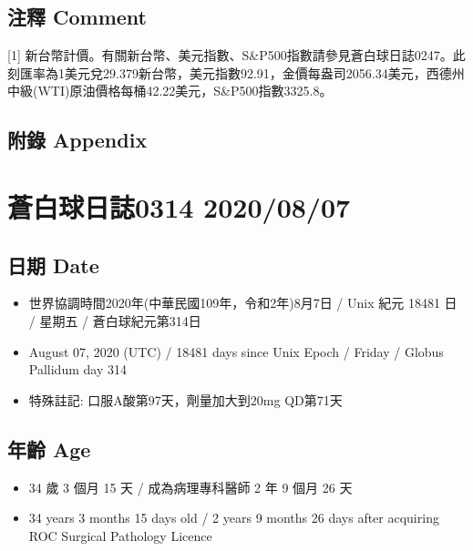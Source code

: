 \documentclass[
]{article}
\providecommand{\tightlist}{%
  \setlength{\itemsep}{0pt}\setlength{\parskip}{0pt}}
\begin{document}
\hypertarget{ux6ce8ux91cb-comment-5}{%
\subsection{注釋 Comment}\label{ux6ce8ux91cb-comment-5}}

{[}1{]}
新台幣計價。有關新台幣、美元指數、S\&P500指數請參見蒼白球日誌0247。此刻匯率為1美元兌29.379新台幣，美元指數92.91，金價每盎司2056.34美元，西德州中級(WTI)原油價格每桶42.22美元，S\&P500指數3325.8。

\hypertarget{ux9644ux9304-appendix-5}{%
\subsection{附錄 Appendix}\label{ux9644ux9304-appendix-5}}

\hypertarget{ux84bcux767dux7403ux65e5ux8a8c0314-20200807}{%
\section{蒼白球日誌0314
2020/08/07}\label{ux84bcux767dux7403ux65e5ux8a8c0314-20200807}}

\hypertarget{ux65e5ux671f-date-6}{%
\subsection{日期 Date}\label{ux65e5ux671f-date-6}}

\begin{itemize}
\tightlist
\item
  世界協調時間2020年(中華民國109年，令和2年)8月7日 / Unix 紀元 18481 日
  / 星期五 / 蒼白球紀元第314日
\item
  August 07, 2020 (UTC) / 18481 days since Unix Epoch / Friday / Globus
  Pallidum day 314
\item
  特殊註記: 口服A酸第97天，劑量加大到20mg QD第71天
\end{itemize}

\hypertarget{ux5e74ux9f61-age-6}{%
\subsection{年齡 Age}\label{ux5e74ux9f61-age-6}}

\begin{itemize}
\tightlist
\item
  34 歲 3 個月 15 天 / 成為病理專科醫師 2 年 9 個月 26 天
\item
  34 years 3 months 15 days old / 2 years 9 months 26 days after
  acquiring ROC Surgical Pathology Licence
\end{itemize}
\end{document}
